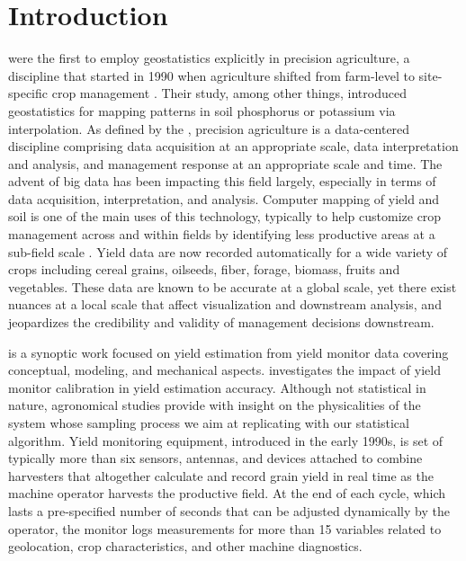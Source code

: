 \section{Introduction}

\cite{Miller1988} were the first to employ geostatistics explicitly in
precision agriculture, a discipline that started in 1990 when
agriculture shifted from farm-level to site-specific crop management
\citep{Oliver2010}. Their study, among other things, introduced
geostatistics for mapping patterns in soil phosphorus or potassium via
interpolation. As defined by the \citet{Council1997}, precision
agriculture is a data-centered discipline comprising data acquisition
at an appropriate scale, data interpretation and analysis, and
management response at an appropriate scale and time. The advent of
big data has been impacting this field largely, especially in terms of
data acquisition, interpretation, and analysis. Computer mapping of
yield and soil is one of the main uses of this technology, typically
to help customize crop management across and within fields by
identifying less productive areas at a sub-field scale
\citep{Lowenberg-DeBoer2019}. Yield data are now recorded
automatically for a wide variety of crops including cereal grains,
oilseeds, fiber, forage, biomass, fruits and vegetables. These data
are known to be accurate at a global scale, yet there exist nuances at
a local scale that affect visualization and downstream analysis, and
jeopardizes the credibility and validity of management decisions
downstream.

\cite{Ross2008} is a synoptic work focused on yield estimation from
yield monitor data covering conceptual, modeling, and mechanical
aspects. \cite{Arslan2002} investigates the impact of yield monitor
calibration in yield estimation accuracy. Although not statistical in
nature, agronomical studies provide with insight on the physicalities
of the system whose sampling process we aim at replicating with our
statistical algorithm. Yield monitoring equipment, introduced in the
early 1990s, is set of typically more than six sensors, antennas, and
devices attached to combine harvesters that altogether calculate and
record grain yield in real time as the machine operator harvests the
productive field. At the end of each cycle, which lasts a
pre-specified number of seconds that can be adjusted dynamically by
the operator, the monitor logs measurements for more than 15 variables
related to geolocation, crop characteristics, and other machine
diagnostics.

